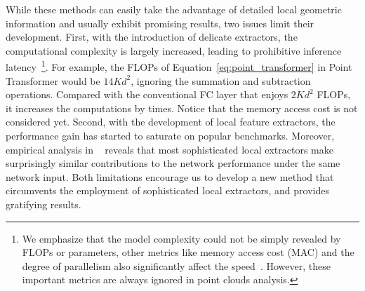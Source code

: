 While these methods can easily take the advantage of detailed local geometric information and usually exhibit promising results, two issues limit their development. First, with the introduction of delicate extractors, the computational complexity is largely increased, leading to prohibitive inference latency~\footnote{We emphasize that the model complexity could not be simply revealed by FLOPs or parameters, other metrics like memory access cost (MAC) and the degree of parallelism also significantly affect the speed~\citep{ma2018shufflenet, zhang2020resnest}. However, these important metrics are always ignored in point clouds analysis.}. 
For example, the FLOPs of Equation~\ref{eq:point_transformer} in Point Transformer would be $14Kd^2$, ignoring the summation and subtraction operations. Compared with the conventional FC layer that enjoys $2Kd^2$ FLOPs, it increases the computations by times. Notice that the memory access cost is not considered yet.
Second, with the development of local feature extractors, the performance gain has started to saturate on popular benchmarks. Moreover, empirical analysis in ~\citet{liu2020closer} reveals that most sophisticated local extractors make surprisingly similar contributions to the network performance under the same network input.
Both limitations encourage us to develop a new method that circumvents the employment of sophisticated local extractors, and provides gratifying results.

